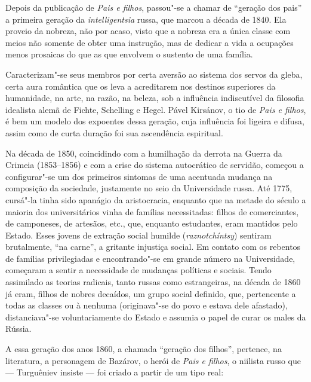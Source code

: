 Depois da publicação de \emph{Pais e filhos}, passou"-se a chamar de
``geração dos pais'' a primeira geração da \emph{intelligentsia} russa,
que marcou a década de 1840. Ela proveio da nobreza, não por acaso,
visto que a nobreza era a única classe com meios não somente de obter
uma instrução, mas de dedicar a vida a ocupações menos prosaicas do que
as que envolvem o sustento de uma família.

Caracterizam"-se seus membros por certa aversão ao sistema dos servos
da gleba, certa aura romântica que os leva a acreditarem nos
destinos superiores da humanidade, na arte, na razão, na beleza, sob a influência indiscutível da filosofia idealista alemã de Fichte, Schelling e Hegel. Pável Kirsánov, o tio de \emph{Pais e filhos}, é bem um modelo dos expoentes dessa geração, cuja influência foi ligeira e difusa, assim como de curta duração foi sua ascendência espiritual.

Na década de 1850, coincidindo com a humilhação da derrota na Guerra da Crimeia (1853--1856) e
com a crise do sistema autocrático de servidão, começou a configurar"-se
um dos primeiros sintomas de uma acentuada mudança na composição da
sociedade, justamente no seio da Universidade russa. Até 1775, cursá"-la tinha
sido apanágio da aristocracia, enquanto que na metade do século  a
maioria dos universitários vinha de famílias necessitadas:
filhos de comerciantes, de camponeses, de artesãos, etc., que,
enquanto estudantes, eram mantidos pelo Estado. Esses jovens de extração
social humilde (\emph{raznotchíntsy}) sentiram brutalmente, ``na carne'', a
gritante injustiça social. Em contato com os rebentos de famílias
privilegiadas e encontrando"-se em grande número na Universidade,
começaram a sentir a necessidade de mudanças políticas e sociais.
Tendo assimilado as teorias radicais, tanto russas como estrangeiras, na
década de 1860 já eram, filhos de nobres decaídos, um grupo social definido, que,
pertencente a todas as classes ou à nenhuma (originava"-se do povo e estava dele afastado), distanciava"-se
voluntariamente do Estado e assumia o papel de curar os males da
Rússia.

A essa geração dos anos 1860, a chamada ``geração dos filhos'', pertence, na literatura, a personagem de Bazárov, o herói de \emph{Pais
e filhos}, o niilista russo que --- Turguêniev insiste --- foi criado a
partir de um tipo real:

